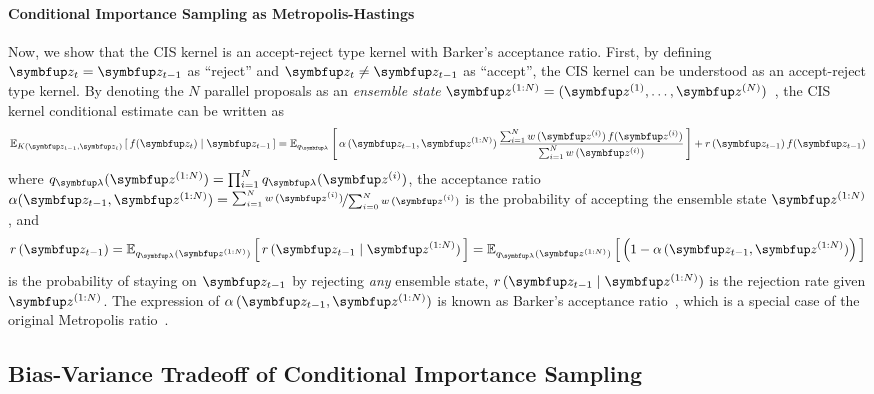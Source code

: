 \vspace{-0.1in}
\paragraph{Conditional Importance Sampling as Metropolis-Hastings}
Now, we show that the CIS kernel is an accept-reject type kernel with Barker's acceptance ratio.
First, by defining \(\vz_t = \vz_{t-1}\) as ``reject'' and \(\vz_t \neq \vz_{t-1}\) as ``accept'', the CIS kernel can be understood as an accept-reject type kernel.
By denoting the \(N\) parallel proposals as an \textit{ensemble state} \(\vz^{(1:N)} = (\vz^{(1)}, \ldots, \vz^{(N)})\)~\citep{neal_mcmc_2011a}, the CIS kernel conditional estimate can be written as
%
{%
  \begin{align}
    \Esub{K(\vz_{t-1}, \vz_t)}{f(\vz_t)\mid\vz_{t-1}}  = 
    \Esub{q_{\vlambda}}{
      \alpha\,(\vz_{t-1}, \vz^{(1:N)}) \,
      \frac{
        \sum^{N}_{i=1} w\,(\vz^{(i)})\,f(\vz^{(i)})
      }
           {
             \sum^{N}_{i=1} w\,(\vz^{(i)})
           }
    }
    + r\,(\vz_{t-1}) \, f(\vz_{t-1})\label{eq:cis_kernel}
  \end{align}
}
where \(q_{\vlambda}(\vz^{(1:N)}) = \prod^N_{i=1} q_{\vlambda}(\vz^{(i)}) \),
the acceptance ratio
\(
  \alpha(\vz_{t-1}, \vz^{(1:N)})
  = \nicefrac{\sum^{N}_{i=1} w\,(\vz^{(i)})}{\sum^{N}_{i=0} w\,(\vz^{(i)})}
\)
is the probability of accepting the ensemble state \(\vz^{(1:N)}\), and
\begin{align}
  r\,(\vz_{t-1}) = \Esub{q_{\vlambda}(\vz^{(1:N)})}{
    r\,(\vz_{t-1} \mid \vz^{(1:N)})
  }
  = \Esub{q_{\vlambda}(\vz^{(1:N)})}{
    \left(1 - \alpha\,(\vz_{t-1}, \vz^{(1:N)})\right)
  }
\end{align}
is the probability of staying on \(\vz_{t-1}\) by rejecting \textit{any} ensemble state, \(r\,(\vz_{t-1}\mid \vz^{(1:N)})\) is the rejection rate given \(\vz^{(1:N)}\).
The expression of \(\alpha\,(\vz_{t-1}, \vz^{(1:N)})\) is known as Barker's acceptance ratio~\citep{barker_monte_1965}, which is a special case of the original Metropolis ratio~\citep{metropolis_equation_1953}.


\subsection{Bias-Variance Tradeoff of Conditional Importance Sampling}\label{section:bias_variance}
